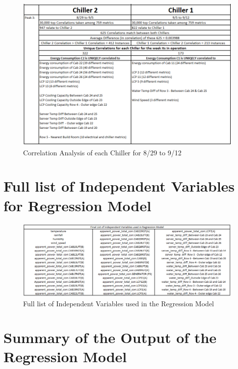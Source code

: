 \documentclass[12pt]{scrartcl}
\begin{document}
\begin{figure}[H]
  \caption{Correlation Analysis of each Chiller for 8/29 to 9/12}
  \label{fig:peak3chillercorrelation}
  \centering
    \includegraphics[scale=0.50]{peak3chillercorrelation}
\end{figure}


\section{Full list of Independent Variables for Regression Model}
\label{sec:[Full list of Independent Variables for Regression Model]}

\begin{figure}[H]
  \caption{Full list of Independent Variables used in the Regression Model}
  \label{fig:independentvariables}
  \centering
    \includegraphics[scale=0.50]{independentvariables}
\end{figure} 

\section{Summary of the Output of the Regression Model}
\label{sec:[Summary of the Output of the Regression Model]}
\end{document}
